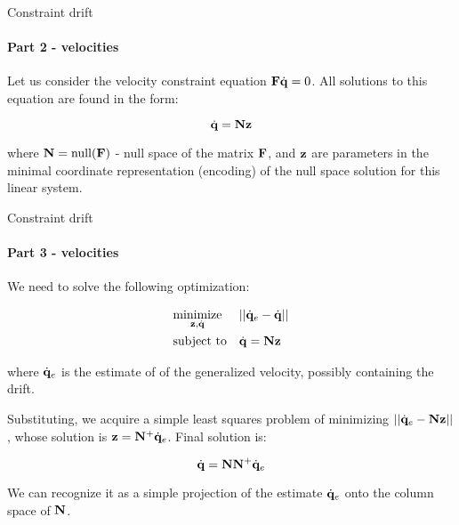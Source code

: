 \documentclass{beamer}
\begin{document}
\begin{frame}{Constraint drift}
\framesubtitle{Part 2 - velocities}
\begin{flushleft}

Let us consider the velocity constraint equation $\mathbf{F} \dot{\mathbf{q}} = 0$. All solutions to this equation are found in the form:

\begin{equation}
    \dot{\mathbf{q}} = \mathbf{N}\mathbf{z}
\end{equation}

where $\mathbf{N} = \text{null}(\mathbf{F})$ - null space of the matrix $\mathbf{F}$, and $\mathbf{z}$ are parameters in the minimal coordinate representation (encoding) of the null space solution for this linear system. 


\end{flushleft}
\end{frame}





\begin{frame}{Constraint drift}
\framesubtitle{Part 3 - velocities}
\begin{flushleft}


We need to solve the following optimization:

\begin{equation}
\begin{aligned}
& \underset{\bo{z}, \dot{\bo{q}}}{\text{minimize}}
& & || \dot{\bo{q}}_e - \dot{\bo{q}} || \\
& \text{subject to}
& & \dot{\bo{q}} = \bo{N}\bo{z}
%
\end{aligned}
\end{equation}

where $\dot{\mathbf{q}}_e$ is the estimate of of the generalized velocity, possibly containing the drift.

\bigskip

Substituting, we acquire a simple least squares problem of minimizing $||\dot{\mathbf{q}}_e - \mathbf{N}\mathbf{z}||$, whose solution is $\mathbf{z} = \mathbf{N}^+\dot{\mathbf{q}}_e$. Final solution is:

\begin{equation}
    \dot{\mathbf{q}} = \mathbf{N}\mathbf{N}^+\dot{\mathbf{q}}_e
\end{equation}

We can recognize it as a simple projection of the estimate $\dot{\mathbf{q}}_e$ onto the column space of $\mathbf{N}$.

\end{flushleft}
\end{frame}
\end{document}
